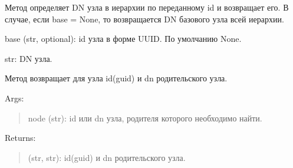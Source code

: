 \documentclass[a4paper,10pt,russian]{sphinxmanual}
\begin{document}
\begin{fulllineitems}
\begin{fulllineitems}
\begin{description}
\end{description}

\end{fulllineitems}



\begin{fulllineitems}

\pysigstartsignatures
{}
\pysigstopsignatures
\sphinxAtStartPar
Метод определяет DN узла в иерархии по переданному id и
возвращает его.
В случае, если base = None, то возвращается DN базового узла
всей иерархии.
\begin{description}
\sphinxAtStartPar
base (str, optional): id узла в форме UUID. По умолчанию \sphinxhyphen{} None.

\sphinxAtStartPar
str: DN узла.

\end{description}

\end{fulllineitems}



\begin{fulllineitems}

\pysigstartsignatures
{}
\pysigstopsignatures
\sphinxAtStartPar
Метод возвращает для узла  id(guid) и dn
родительского узла.

\sphinxAtStartPar
Args:
\begin{quote}

\sphinxAtStartPar
node (str): id или dn узла, родителя которого необходимо найти.
\end{quote}

\sphinxAtStartPar
Returns:
\begin{quote}

\sphinxAtStartPar
(str, str): id(guid) и dn родительского узла.
\end{quote}


\end{fulllineitems}
\end{fulllineitems}
\end{document}

